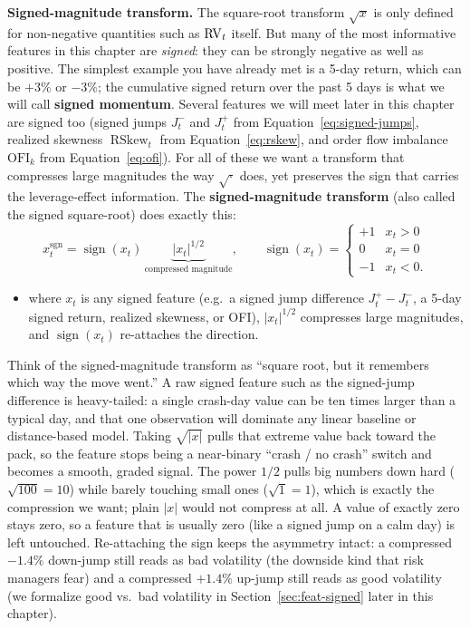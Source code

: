 \textbf{Signed-magnitude transform.}
The square-root transform $\sqrt{x}$ is only defined for non-negative quantities such as $\operatorname{RV}_t$ itself. But many of the most informative features in this chapter are \emph{signed}: they can be strongly negative as well as positive. The simplest example you have already met is a 5-day return, which can be $+3\%$ or $-3\%$; the cumulative signed return over the past 5 days is what we will call \textbf{signed momentum}. Several features we will meet later in this chapter are signed too (signed jumps $J_t^-$ and $J_t^+$ from Equation~\ref{eq:signed-jumps}, realized skewness $\operatorname{RSkew}_t$ from Equation~\ref{eq:rskew}, and order flow imbalance $\text{OFI}_k$ from Equation~\ref{eq:ofi}). For all of these we want a transform that compresses large magnitudes the way $\sqrt{\cdot}$ does, yet preserves the sign that carries the leverage-effect information. The \textbf{signed-magnitude transform} (also called the signed square-root) does exactly this:
\begin{equation}\label{eq:signed-magnitude}
x_t^{\text{sgn}} = \operatorname{sign}(x_t)\,\underbrace{|x_t|^{1/2}}_{\text{compressed magnitude}},
\qquad \operatorname{sign}(x_t) = \begin{cases} +1 & x_t > 0 \\ 0 & x_t = 0 \\ -1 & x_t < 0. \end{cases}
\end{equation}
\begin{itemize}[nosep]
  \item where $x_t$ is any signed feature (e.g.\ a signed jump difference $J_t^+ - J_t^-$, a 5-day signed return, realized skewness, or OFI), $|x_t|^{1/2}$ compresses large magnitudes, and $\operatorname{sign}(x_t)$ re-attaches the direction.
\end{itemize}

\begin{intuition}
Think of the signed-magnitude transform as ``square root, but it remembers which way the move went.'' A raw signed feature such as the signed-jump difference is heavy-tailed: a single crash-day value can be ten times larger than a typical day, and that one observation will dominate any linear baseline or distance-based model. Taking $\sqrt{|x|}$ pulls that extreme value back toward the pack, so the feature stops being a near-binary ``crash / no crash'' switch and becomes a smooth, graded signal. The power $1/2$ pulls big numbers down hard ($\sqrt{100}=10$) while barely touching small ones ($\sqrt{1}=1$), which is exactly the compression we want; plain $|x|$ would not compress at all. A value of exactly zero stays zero, so a feature that is usually zero (like a signed jump on a calm day) is left untouched. Re-attaching the sign keeps the asymmetry intact: a compressed $-1.4\%$ down-jump still reads as bad volatility (the downside kind that risk managers fear) and a compressed $+1.4\%$ up-jump still reads as good volatility (we formalize good vs.\ bad volatility in Section~\ref{sec:feat-signed} later in this chapter).
\end{intuition}


